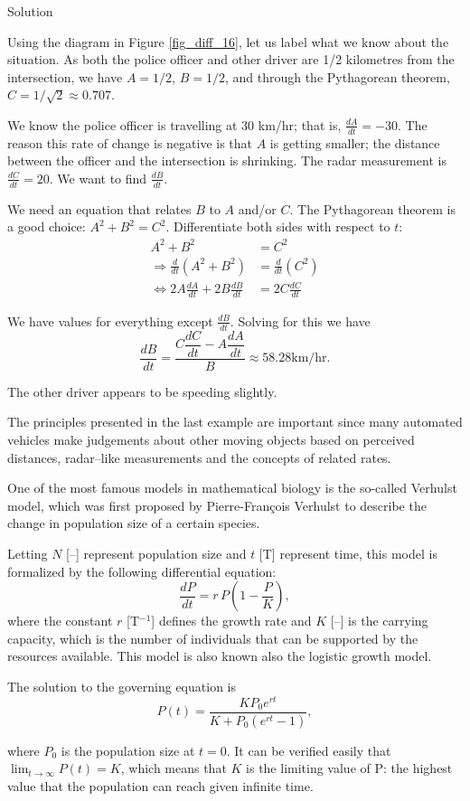 \begin{example}
Solution 

Using the diagram in Figure \ref{fig_diff_16}, let us label what we know about the situation. As both the police officer and other driver are 1/2 kilometres from the intersection, we have $A = 1/2$, $B = 1/2$, and through the Pythagorean theorem, $C = 1/\sqrt{2}\approx 0.707$. 

We know the police officer is travelling at 30 km/hr; that is, $\frac{dA}{dt} = -30$. The reason this rate of change is negative is that $A$ is getting smaller; the distance between the officer and the intersection is shrinking. The radar measurement is $\frac{dC}{dt} = 20$. We want to find $\frac{dB}{dt}$. 

We need an equation that relates $B$ to $A$ and/or $C$. The Pythagorean theorem is a good choice: $A^2+B^2 = C^2$. Differentiate both sides with respect to $t$:
\begin{align*}
		A^2 + B^2 &= C^2 \\
		\Rightarrow\frac{d}{dt}\left(A^2+B^2\right) &= \frac{d}{dt}\left(C^2\right) \\[0.2cm]
		\Leftrightarrow 2A\frac{dA}{dt} + 2B\frac{dB}{dt} &= 2C\frac{dC}{dt}
\end{align*}

We have values for everything except $\frac{dB}{dt}$. Solving for this we have 
		$$\frac{dB}{dt} = \frac{C\dfrac{dC}{dt}- A\dfrac{dA}{dt}}{B} \approx 58.28\text{km/hr}.$$
		
The other driver appears to be speeding slightly.		
\end{example}

The principles presented in the last example are important since many automated vehicles make judgements about other moving objects based on perceived distances, radar--like measurements and the concepts of related rates.

\begin{remark}
One of the most famous models in mathematical biology is the so-called Verhulst model, which was first proposed by Pierre-Fran\c{c}ois Verhulst to describe the change in population size of a certain species. 

Letting $N$ [--] represent population size and $t$ [T] represent time, this model is formalized by the following differential equation:
$$
\displaystyle {\frac {dP}{dt}}=r\,P \left(1-{\frac {P}{K}}\right),
$$
where the constant $r$ [T$^{-1}$] defines the growth rate and $K$ [--] is the carrying capacity, which is the number of individuals that can be supported by the resources available. This model is also known also the logistic growth model. 

The solution to the governing equation is
$$
\displaystyle P(t)={\frac {KP_{0}e^{rt}}{K+P_{0}\left(e^{rt}-1\right)}},
$$

where $P_0$ is the population size at $t=0$. It can be verified easily that 
$\displaystyle \lim _{t\to \infty }P(t)=K$, which means that $K$ is the limiting value of P: the highest value that the population can reach given infinite time.
\end{remark}

